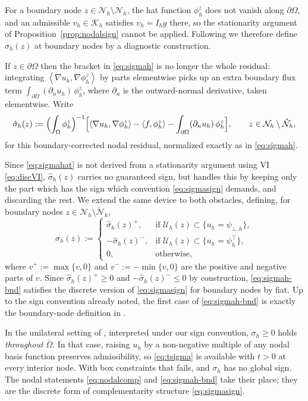 \documentclass[12pt]{amsart}
\numberwithin{equation}{section}
\theoremstyle{plain}
\theoremstyle{definition}
\theoremstyle{remark}
\newcommand{\Om}{\Omega}
\newcommand{\dOm}{\partial\Omega}
\newcommand{\psiloh}{\psi_{\bot,h}}
\newcommand{\psiuph}{\psi^\top_h}
\newcommand{\Nh}{\mathcal{N}_h}
\newcommand{\Nhr}{\mathring{\mathcal{N}}_h}
\newcommand{\Ih}{I_h}
\newcommand{\Uh}{\mathcal{U}_h}
\newcommand{\Kh}{\mathcal{K}_h}
\begin{document}
For a boundary node $z \in \Nh \setminus \Nhr$, the hat function $\phi_h^z$ does not vanish along $\dOm$, and an admissible $v_h\in\Kh$ satisfies $v_h = \Ih g$ there, so the stationarity argument of Proposition~\ref{prop:nodalsign} cannot be applied.  Following \cite[\S 2.1]{NSV03} we therefore define $\sigma_h(z)$ at boundary nodes by a diagnostic construction.

If $z\in\dOm$ then the bracket in \eqref{eq:sigmah} is no longer the whole residual: integrating $\left<\nabla u_h,\nabla\phi_h^z\right>$ by parts elementwise picks up an extra boundary flux term $\int_{\dOm} (\partial_n u_h)\,\phi_h^z$, where $\partial_n$ is the outward-normal derivative, taken elementwise. Write
\begin{equation}
\label{eq:sigmahat}
  \hat\sigma_h(z) := \Bigl(\int_\Om \phi_h^z\Bigr)^{-1}
  \Bigl[\left<\nabla u_h,\nabla\phi_h^z\right> - \left< f,\phi_h^z\right> - \int_{\dOm} (\partial_n u_h)\,\phi_h^z\Bigr],
  \qquad z \in \Nh\setminus\Nhr,
\end{equation}
for this boundary-corrected nodal residual, normalized exactly as in \eqref{eq:sigmah}.

Since \eqref{eq:sigmahat} is not derived from a stationarity argument using VI \eqref{eq:discVI}, $\hat\sigma_h(z)$ carries no guaranteed sign, but \cite{NSV03} handles this by keeping only the part which has the sign which convention \eqref{eq:sigmasign} demands, and discarding the rest.  We extend the same device to both obstacles, defining, for boundary nodes $z \in \Nh\setminus\Nhr$,
\begin{equation}
\label{eq:sigmah-bnd}
  \sigma_h(z) := \begin{cases}
    \hat\sigma_h(z)^+, & \text{if } \Uh(z) \subset \{u_h = \psiloh\}, \\
    -\hat\sigma_h(z)^-, & \text{if } \Uh(z) \subset \{u_h = \psiuph\}, \\
    0, & \text{otherwise},
  \end{cases}
\end{equation}
where $v^+ := \max\{v,0\}$ and $v^- := -\min\{v,0\}$ are the positive and negative parts of $v$.  Since $\hat\sigma_h(z)^+ \ge 0$ and $-\hat\sigma_h(z)^- \le 0$ by construction, \eqref{eq:sigmah-bnd} satisfies the discrete version of \eqref{eq:sigmasign} for boundary nodes by fiat.  Up to the sign convention already noted, the first case of \eqref{eq:sigmah-bnd} is exactly the boundary-node definition in \cite[\S 2.1]{NSV03}.

In the unilateral setting of \cite{NSV03}, interpreted under our sign convention, $\sigma_h \ge 0$ holds \emph{throughout} $\bar\Om$.  In that case, raising $u_h$ by a non-negative multiple of any nodal basis function preserves admissibility, so \eqref{eq:tsigma} is available with $t > 0$ at every interior node.  With box constraints that fails, and $\sigma_h$ has no global sign.  The nodal statements \eqref{eq:nodalcomp} and \eqref{eq:sigmah-bnd} take their place; they are the discrete form of complementarity structure \eqref{eq:sigmasign}.
\end{document}
